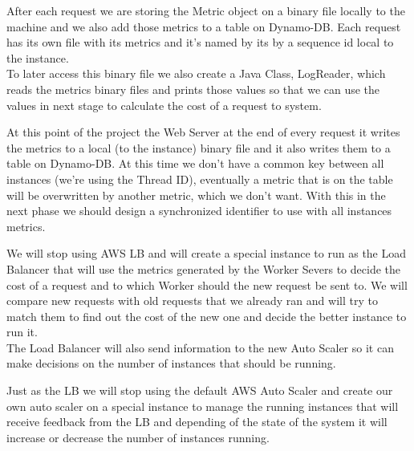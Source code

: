 \documentclass[times, 10pt,twocolumn]{article}
\begin{document}
   After each request we are storing the Metric object on a binary file locally
   to the machine and we also add those metrics to a table on Dynamo-DB.
   Each request has its own file with its metrics and it's named by its by 
   a sequence id local to the instance.\\
   To later access this binary file we also create a Java Class, LogReader, 
   which reads the metrics binary files and prints those values so that we can 
   use the values in next stage to calculate the cost of a request to
   system.


   At this point of the project the Web Server at the end of every request 
   it writes the metrics to a local (to the instance) binary file and it 
   also writes them to a table on Dynamo-DB. At this time we don't have 
   a common key between all instances (we're using the Thread ID), eventually
   a metric that is on the table will be overwritten by another metric, which 
   we don't want. With this in the next phase we should design a synchronized
   identifier to use with all instances metrics.


   We will stop using AWS LB and will create a special instance to run as the 
   Load Balancer that will use the metrics generated by the Worker Severs to
   decide the cost of a request and to which Worker should the new request be
   sent to. We will compare new requests with old requests that we already ran
   and will try to match them to find out the cost of the new one and decide
   the better instance to run it.\\ 
   The Load Balancer will also send information to the new Auto Scaler so it 
   can make decisions on the number of instances that should be running.

   Just as the LB we will stop using the default AWS Auto Scaler and create our 
   own auto scaler on a special instance to manage the running instances that will 
   receive feedback from the LB and depending of the state of the system it will
   increase or decrease the number of instances running.

\end{document}
